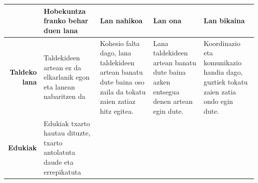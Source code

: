 \documentclass[]{book}
\begin{document}
\begin{longtable}[]{@{}rllll@{}}
\toprule
\begin{minipage}[b]{0.11\columnwidth}\raggedleft
\strut
\end{minipage} & \begin{minipage}[b]{0.19\columnwidth}\raggedright
\textbf{Hobekuntza franko behar duen lana}\strut
\end{minipage} & \begin{minipage}[b]{0.19\columnwidth}\raggedright
\textbf{Lan nahikoa}\strut
\end{minipage} & \begin{minipage}[b]{0.19\columnwidth}\raggedright
\textbf{Lan ona}\strut
\end{minipage} & \begin{minipage}[b]{0.19\columnwidth}\raggedright
\textbf{Lan bikaina}\strut
\end{minipage}\tabularnewline
\midrule
\endhead
\begin{minipage}[t]{0.11\columnwidth}\raggedleft
\textbf{Taldeko lana}\strut
\end{minipage} & \begin{minipage}[t]{0.19\columnwidth}\raggedright
Taldekideen artean ez da elkarlanik egon eta lanean nabaritzen da\strut
\end{minipage} & \begin{minipage}[t]{0.19\columnwidth}\raggedright
Kohesio falta dago, lana taldekideen artean banatu dute baina oso zaila da tokatu zaien zatiaz hitz egitea.\strut
\end{minipage} & \begin{minipage}[t]{0.19\columnwidth}\raggedright
Lana taldekideen artean banatu dute baina azken entsegua denen artean egin dute.\strut
\end{minipage} & \begin{minipage}[t]{0.19\columnwidth}\raggedright
Koordinazio eta komunikazio handia dago, guztiek tokatu zaien zatia ondo egin dute.\strut
\end{minipage}\tabularnewline
\begin{minipage}[t]{0.11\columnwidth}\raggedleft
\textbf{Edukiak}\strut
\end{minipage} & \begin{minipage}[t]{0.19\columnwidth}\raggedright
Edukiak txarto hautau dituzte, txarto antolatuta daude eta errepikatuta\strut
\end{minipage} & \begin{minipage}[t]{0.19\columnwidth}\raggedright

\end{minipage}
\end{longtable}
\end{document}
